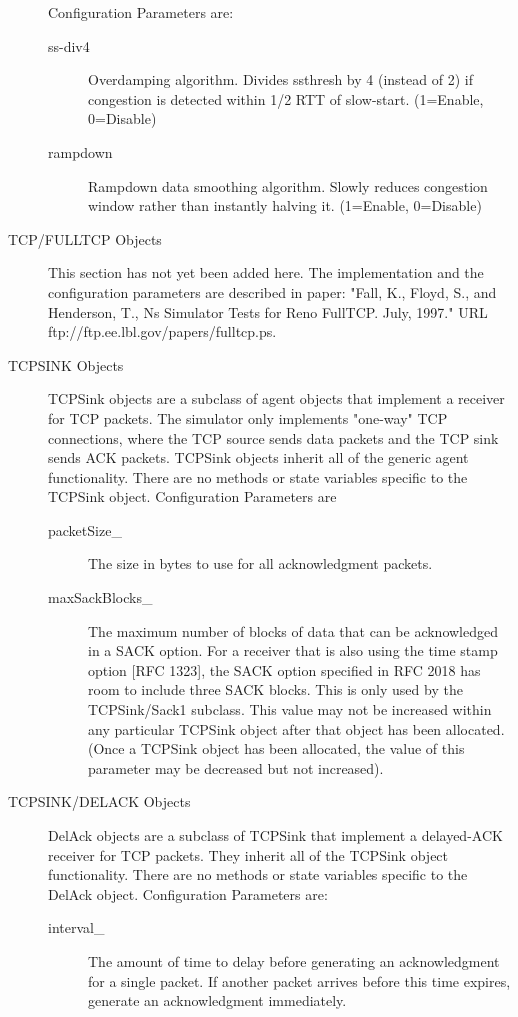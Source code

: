 \begin{description}
Configuration Parameters are:
\begin{description}
\item[ss-div4]
Overdamping algorithm. Divides ssthresh by 4 (instead of 2) if congestion
is detected within 1/2 RTT of slow-start. (1=Enable, 0=Disable) 

\item[rampdown]
Rampdown data smoothing algorithm. Slowly reduces congestion window rather
than instantly halving it. (1=Enable, 0=Disable) 
\end{description}


\item[TCP/FULLTCP Objects]
This section has not yet been added here. The implementation
and the configuration parameters are described in paper: "Fall, K.,
Floyd, S., and Henderson, T., Ns Simulator Tests for Reno FullTCP.
July, 1997." URL ftp://ftp.ee.lbl.gov/papers/fulltcp.ps. 


\item[TCPSINK Objects]
TCPSink objects are a subclass of agent objects that implement a receiver
for TCP packets. The simulator only implements "one-way" TCP connections,
where the TCP source sends data packets and the TCP sink sends ACK
packets. TCPSink objects inherit all of the generic agent functionality.
There are no methods or state variables specific to the TCPSink object. 
Configuration Parameters are
\begin{description}
\item[packetSize\_]
The size in bytes to use for all acknowledgment packets. 

\item[maxSackBlocks\_]
The maximum number of blocks of data that can be acknowledged in a SACK
option. For a receiver that is also using the time stamp option [RFC
1323], the SACK option specified in RFC 2018 has room to include three
SACK blocks. This is only used by the TCPSink/Sack1 subclass. This value
may not be increased within any particular TCPSink object after that
object has been allocated. (Once a TCPSink object has been allocated, the
value of this parameter may be decreased but not increased). 
\end{description}


\item[TCPSINK/DELACK Objects]
DelAck objects are a subclass of TCPSink that implement a delayed-ACK
receiver for TCP packets. They inherit all of the TCPSink object
functionality. There are no methods or state variables specific to the
DelAck object. 
Configuration Parameters are:
\begin{description}
\item[interval\_]
The amount of time to delay before generating an acknowledgment for a
single packet. If another packet arrives before this time expires,
generate an acknowledgment immediately. 


\end{description}
\end{description}
